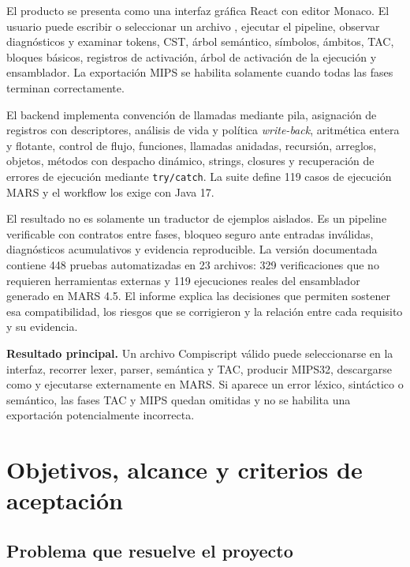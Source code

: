 \documentclass[11pt,letterpaper,oneside]{report}
\newcommand{\codigo}[1]{\texttt{#1}}
\newcommand{\archivo}[1]{\path{#1}}
\newenvironment{destacado}{\begin{center}\begin{minipage}{0.93\textwidth}\color{tinta}\setlength{\parskip}{0.35em}}{\end{minipage}\end{center}}
\begin{document}
El producto se presenta como una interfaz gr\'afica React con editor Monaco. El usuario puede escribir o seleccionar un archivo \archivo{.cps}, ejecutar el pipeline, observar diagn\'osticos y examinar tokens, CST, \'arbol sem\'antico, s\'imbolos, \'ambitos, TAC, bloques b\'asicos, registros de activaci\'on, \'arbol de activaci\'on de la ejecuci\'on y ensamblador. La exportaci\'on MIPS se habilita solamente cuando todas las fases terminan correctamente.

El backend implementa convenci\'on de llamadas mediante pila, asignaci\'on de registros con descriptores, an\'alisis de vida y pol\'itica \emph{write-back}, aritm\'etica entera y flotante, control de flujo, funciones, llamadas anidadas, recursi\'on, arreglos, objetos, m\'etodos con despacho din\'amico, strings, closures y recuperaci\'on de errores de ejecuci\'on mediante \codigo{try/catch}. La suite define 119 casos de ejecuci\'on MARS y el workflow los exige con Java 17.

El resultado no es solamente un traductor de ejemplos aislados. Es un pipeline verificable con contratos entre fases, bloqueo seguro ante entradas inv\'alidas, diagn\'osticos acumulativos y evidencia reproducible. La versi\'on documentada contiene 448 pruebas automatizadas en 23 archivos: 329 verificaciones que no requieren herramientas externas y 119 ejecuciones reales del ensamblador generado en MARS 4.5. El informe explica las decisiones que permiten sostener esa compatibilidad, los riesgos que se corrigieron y la relaci\'on entre cada requisito y su evidencia.

\begin{destacado}
\textbf{Resultado principal.} Un archivo Compiscript v\'alido puede seleccionarse en la interfaz, recorrer lexer, parser, sem\'antica y TAC, producir MIPS32, descargarse como \archivo{.asm} y ejecutarse externamente en MARS. Si aparece un error l\'exico, sint\'actico o sem\'antico, las fases TAC y MIPS quedan omitidas y no se habilita una exportaci\'on potencialmente incorrecta.
\end{destacado}

\chapter{Objetivos, alcance y criterios de aceptaci\'on}

\section{Problema que resuelve el proyecto}
\end{document}
